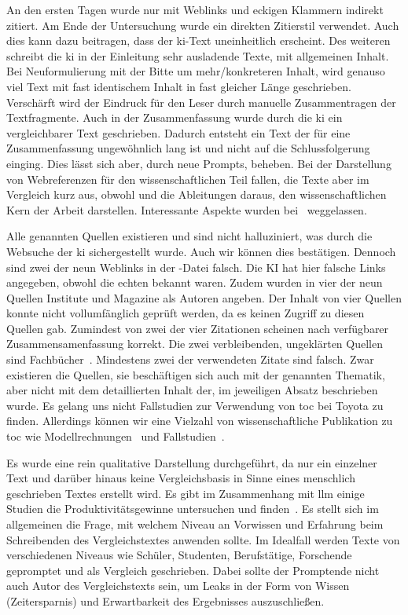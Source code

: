 An den ersten Tagen wurde nur mit Weblinks und eckigen Klammern indirekt zitiert. Am Ende der Untersuchung wurde ein direkten Zitierstil verwendet. Auch dies kann dazu beitragen, dass der \gls{ki}-Text uneinheitlich erscheint. Des weiteren schreibt die \gls{ki} in der Einleitung sehr ausladende Texte, mit allgemeinen Inhalt. Bei Neuformulierung mit der Bitte um mehr/konkreteren Inhalt, wird genauso viel Text mit fast identischem Inhalt in fast gleicher Länge geschrieben. Verschärft wird der Eindruck für den Leser durch manuelle Zusammentragen der Textfragmente. 
Auch in der Zusammenfassung wurde durch die \gls{ki} ein vergleichbarer Text geschrieben. Dadurch entsteht ein Text der für eine Zusammenfassung ungewöhnlich lang ist und nicht auf die Schlussfolgerung einging. Dies lässt sich aber, durch neue Prompts, beheben. Bei der Darstellung von Webreferenzen für den wissenschaftlichen Teil fallen, die Texte aber im Vergleich kurz aus, obwohl und die Ableitungen daraus, den wissenschaftlichen Kern der Arbeit darstellen. Interessante Aspekte wurden bei~\cite{ibscmr2003toyotakaizen} weggelassen.
 
Alle genannten Quellen existieren und sind nicht halluziniert, was durch die Websuche der \gls{ki} sichergestellt wurde. Auch wir können dies bestätigen. Dennoch sind zwei der neun Weblinks in der \BibTeX{}-Datei falsch. Die KI hat hier falsche Links angegeben, obwohl die echten bekannt waren. Zudem wurden in vier der neun Quellen Institute und Magazine als Autoren angeben. Der Inhalt von vier Quellen konnte nicht vollumfänglich geprüft werden, da es keinen Zugriff zu diesen Quellen gab. Zumindest von zwei der vier Zitationen scheinen nach verfügbarer Zusammensamenfassung korrekt. Die zwei verbleibenden, ungeklärten Quellen sind Fachbücher~\cite{imai1986kaizen, womack1996lean}. Mindestens zwei der verwendeten Zitate sind falsch. Zwar existieren die Quellen, sie beschäftigen sich auch mit der genannten Thematik, aber nicht mit dem detaillierten Inhalt der, im jeweiligen Absatz beschrieben wurde. 
Es gelang uns nicht Fallstudien zur Verwendung von \gls{toc} bei Toyota zu finden. Allerdings können wir eine Vielzahl von wissenschaftliche Publikation zu \gls{toc} wie Modellrechnungen~\cite{gundogar_dynamic_2016, thurer_bottleneck-oriented_2018} und Fallstudien~\cite{umble_implementing_2006}. 

Es wurde eine rein qualitative Darstellung durchgeführt, da nur ein einzelner Text und darüber hinaus keine Vergleichsbasis in Sinne eines menschlich geschrieben Textes erstellt wird. Es gibt im Zusammenhang mit \gls{llm} einige Studien die Produktivitätsgewinne untersuchen und finden~\cite{noy_experimental_2023}. Es stellt sich im allgemeinen die Frage, mit welchem Niveau an Vorwissen und Erfahrung beim Schreibenden des Vergleichstextes anwenden sollte. Im Idealfall werden Texte von verschiedenen Niveaus wie Schüler, Studenten, Berufstätige, Forschende gepromptet und als Vergleich geschrieben. Dabei sollte der Promptende nicht auch Autor des Vergleichstexts sein, um Leaks in der Form von Wissen (Zeitersparnis) und Erwartbarkeit des Ergebnisses auszuschließen.


